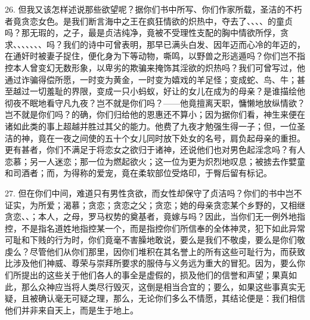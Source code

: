 26. 但我又该怎样述说那些欲望呢？据你们书中所写、你们作家所载，圣洁的不朽者竟贪恋女色。是我们断言海中之王在疯狂情欲的炽热中，夺去了、、、、的童贞吗？那无瑕的，之子，最是贞洁纯净，竟被不受理性支配的胸中情欲所俘，贪求、、、、、、、吗？我们的诗中可曾表明，那早已满头白发、因年迈而心冷的年迈的，在通奸时被妻子捉住，便化身为下等动物，嘶鸣，以野兽之形逃遁吗？你们岂不指控本人曾变幻无数形象，以卑劣的欺骗来掩饰其淫欲的炽热吗？我们可曾写过，他通过诈骗得偿所愿，一时变为黄金，一时变为嬉戏的羊足怪；变成蛇、鸟、牛；甚至越过一切羞耻的界限，变成一只小蚂蚁，好让的女儿在成为的母亲？是谁描绘他彻夜不眠地看守凡九夜？岂不就是你们吗？——他竟擅离天职，慵懒地放纵情欲？岂不就是你们吗？的确，你们归给他的恩惠还不算小；因为据你们看，神生来便在诸如此类的事上超越并胜过其父的能力。他费了九夜才勉强生得一子；但，一位圣洁的神，竟在一夜之间使的五十个女儿同时放下处女的名号，肩负起母亲的重担。更有甚者，你们不满足于将恋女之欲归于诸神，还说他们也对男色起淫念吗？有人恋慕；另一人迷恋；那一位为燃起欲火；这一位为更为炽烈地叹息；被掳去作嬖童和司酒者；而，为得称的爱宠，竟在柔软部位受烙印，于臀后留有标记。\par

27. 但在你们中间，难道只有男性贪欲，而女性却保守了贞洁吗？你们的书中岂不证实，为所爱；渴慕；贪恋；贪恋之父；贪恋；她的母亲贪恋某个乡野的，又相继贪恋、、；本人，之母，罗马权势的奠基者，竟嫁与吗？因此，当你们无一例外地指控，不是指名道姓地指控某一个，而是指控你们所信奉的全体神灵，犯下如此异常可耻和下贱的行为时，你们竟毫不害臊地敢说，要么是我们不敬虔，要么是你们敬虔么？尽管他们从你们那里，因你们堆积在其名誉上的所有这些可耻行为，而获致比涉及他们神威、尊荣与崇拜所要求的服侍与义务远为重大的冒犯。因为，要么你们所提出的这些关于他们各人的事全是虚假的，损及他们的信誉和声望；果真如此，那么众神应当将人类尽行毁灭，这倒是相当合宜的；要么，如果这些事真实无疑，且被确认毫无可疑之理，那么，无论你们多么不情愿，其结论便是：我们相信他们并非来自天上，而是生于地上。\par

